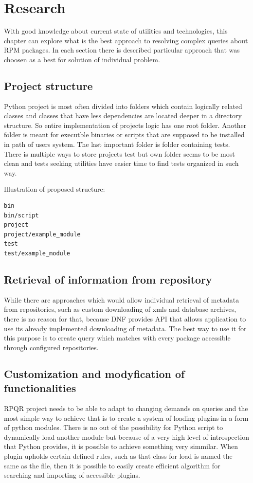 \chapter{Research}
With good knowledge about current state of utilities and technologies, this chapter can explore
what is the best approach to resolving complex queries about RPM packages. In each section
there is described particular approach that was choosen as a best for solution of individual problem.

\section{Project structure}
Python project is most often divided into folders which contain logically related classes
and classes that have less dependencies are located deeper in a directory structure. So entire
implementation of projects logic has one root folder. Another folder is meant for executble
binaries or scripts that are supposed to be installed in path of users system. The last important
folder is folder containing tests. There is multiple ways to store projects test but own folder
seems to be most clean and tests seeking utilities have easier time to find tests organized in
such way.

Illustration of proposed structure:

\begin{lstlisting}
bin
bin/script
project
project/example_module
test
test/example_module
\end{lstlisting}

\newpage

\section{Retrieval of information from repository}
While there are approaches which would allow individual retrieval of metadata from repositories,
such as custom downloading of xmls and database archives, there is no reason for that, because
DNF provides API that allows application to use its already implemented downloading of metadata.
The best way to use it for this purpose is to create query which matches with every package
accessible through configured repositories.

\section{Customization and modyfication of functionalities}
RPQR project needs to be able to adapt to changing demands on queries and the most simple way to
achieve that is to create a system of loading plugins in a form of python modules. There is no
out of the possibility for Python script to dynamically load another module but because of a very
high level of introspection that Python provides, it is possible to achieve something very simmilar.
When plugin upholds certain defined rules, such as that class for load is named the same as the file,
then it is possible to easily create efficient algorithm for searching and importing of accessible
plugins.

